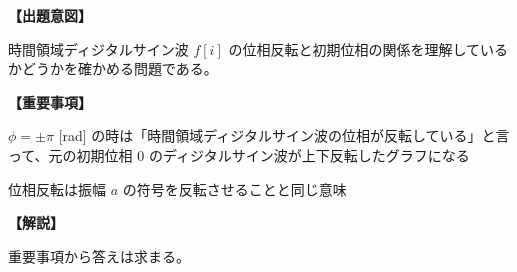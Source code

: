 \noindent \textbf{【出題意図】}

\noindent 時間領域ディジタルサイン波 $f[i]$ の位相反転と初期位相の関係を理解しているかどうかを確かめる問題である。

\vspace{1em}
\noindent \textbf{【重要事項】}

\bigskip
\noindent  $\phi = \pm\pi$ [rad] の時は「時間領域ディジタルサイン波の位相が反転している」と言って、元の初期位相 $0$ のディジタルサイン波が上下反転したグラフになる

\bigskip
\noindent  位相反転は振幅 $a$ の符号を反転させることと同じ意味


\vspace{1em}
\noindent \textbf{【解説】}

\noindent 重要事項から答えは求まる。
